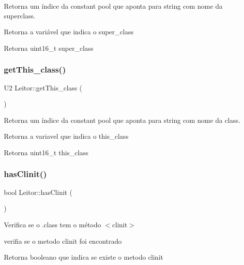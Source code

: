 Retorna um índice da constant pool que aponta para string com nome da superclass. 

Retorna a variável que indica o super\+\_\+class \begin{DoxyReturn}{Retorna}
uint16\+\_\+t super\+\_\+class 
\end{DoxyReturn}
\mbox{\label{classLeitor_a96d06888c1e8d4a6516c5e5f36d49801}} 
\subsubsection{\texorpdfstring{get\+This\+\_\+class()}{getThis\_class()}}
{\footnotesize\ttfamily U2 Leitor\+::get\+This\+\_\+class (\begin{DoxyParamCaption}{ }\end{DoxyParamCaption})}



Retorna um índice da constant pool que aponta para string com nome da class. 

Retorna a variavel que indica o this\+\_\+class \begin{DoxyReturn}{Retorna}
uint16\+\_\+t this\+\_\+class 
\end{DoxyReturn}
\mbox{\label{classLeitor_a31934be87590ff3732b3117ebe96cc34}} 
\subsubsection{\texorpdfstring{has\+Clinit()}{hasClinit()}}
{\footnotesize\ttfamily bool Leitor\+::has\+Clinit (\begin{DoxyParamCaption}{ }\end{DoxyParamCaption})}



Verifica se o .class tem o método $<$clinit$>$ 

verifia se o metodo clinit foi encontrado \begin{DoxyReturn}{Retorna}
booleano que indica se existe o metodo clinit 
\end{DoxyReturn}
\mbox{\label{classLeitor_a737ca7d70af56cab2c01fbfca0c774f7}} 
